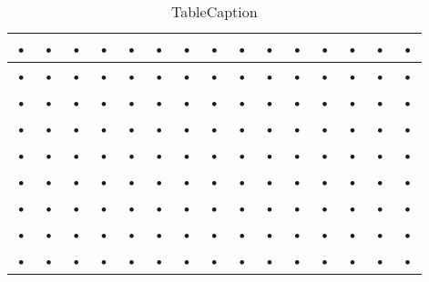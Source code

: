 \begin{table}[htbp]
  \centering
  \begin{tabular}{@{} ccccccccccccccc @{}}
    \toprule
    • & • & • & • & • & • & • & • & • & • & • & • & • & • & • \\ 
    \midrule
    • & • & • & • & • & • & • & • & • & • & • & • & • & • & • \\ 
    • & • & • & • & • & • & • & • & • & • & • & • & • & • & • \\ 
    • & • & • & • & • & • & • & • & • & • & • & • & • & • & • \\ 
    • & • & • & • & • & • & • & • & • & • & • & • & • & • & • \\ 
    • & • & • & • & • & • & • & • & • & • & • & • & • & • & • \\ 
    • & • & • & • & • & • & • & • & • & • & • & • & • & • & • \\ 
    • & • & • & • & • & • & • & • & • & • & • & • & • & • & • \\ 
    • & • & • & • & • & • & • & • & • & • & • & • & • & • & • \\ 
    \bottomrule
  \end{tabular}
  \caption{TableCaption}
  \label{tab:label}
\end{table}
